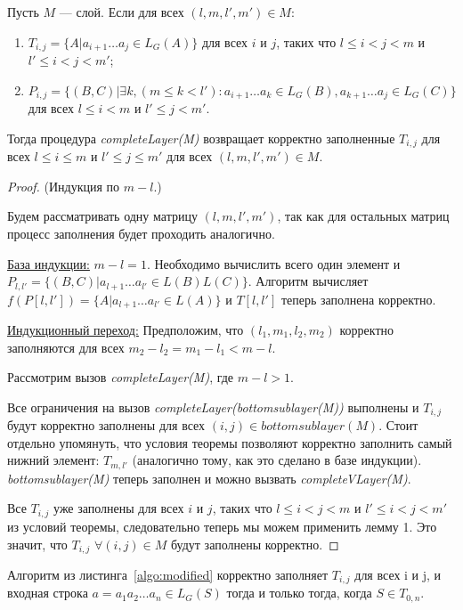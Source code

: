 \documentclass[14pt]{matmex-diploma-custom}
\begin{document}
\begin{theorem}
Пусть $M$ --- слой. Если для всех $(l, m, l', m') \in M$:
\begin{enumerate}
  \item $T_{i, j} = \{ A |  a_{i + 1} \dots a_{j} \in L_G(A)\}$ для всех $i$ и $j$, таких что $l \leq i < j < m$ и $l' \leq i < j < m'$;
  \item $P_{i, j} =  \{ (B, C) |\exists k, (m \le k < l'): a_{i + 1} \dots a_{k} \in L_G(B), a_{k + 1} \dots a_{j} \in L_G(C)\}$ для всех $l \leq i < m$ и $l' \leq j < m'$.
\end{enumerate}

Тогда процедура \textit{completeLayer(M)} возвращает корректно заполненные $T_{i, j}$ для всех $l \leq i \le m$ и $l' \leq j \le m'$ для всех $(l, m, l', m') \in M$.
\end{theorem}


\begin{proof}(Индукция по $m - l$.)

Будем рассматривать одну матрицу $(l, m, l', m')$, так как для остальных матриц процесс заполнения будет проходить аналогично.

\underline{База индукции:} $m - l = 1$. Необходимо вычислить всего один элемент и $P_{l, l'} =  \{ (B, C) |  a_{l + 1} \dots a_{l'} \in L(B)L(C)\}$. Алгоритм вычисляет $f(P[l, l']) = \{ A |  a_{l + 1} \dots a_{l'} \in L(A)\}$ и $T[l, l']$ теперь заполнена корректно.

\underline{Индукционный переход:} Предположим, что $(l_1, m_1, l_2, m_2)$ корректно заполняются для всех $m_2 - l_2 = m_1 - l_1 < m - l$.

Рассмотрим вызов \textit{completeLayer(M)}, где $m - l > 1$.

Все ограничения на вызов \textit{completeLayer(bottomsublayer(M))} выполнены и $T_{i, j}$ будут корректно заполнены для всех $(i, j) \in bottomsublayer(M)$. Стоит отдельно упомянуть, что условия теоремы позволяют корректно заполнить самый нижний элемент: $T_{m, l'}$ (аналогично тому, как это сделано в базе индукции).
\textit{bottomsublayer(M)} теперь заполнен и можно вызвать \textit{completeVLayer(M)}.

Все $T_{i,j}$ уже заполнены для всех $i$ и $j$, таких что $l \leq i < j < m$ и $l' \leq i < j < m'$ из условий теоремы, следовательно теперь мы можем применить лемму 1. Это значит, что $T_{i, j}$ $\forall (i, j) \in M$ будут заполнены корректно.
\end{proof}

\begin{theorem}
Алгоритм из листинга~\ref{algo:modified} корректно заполняет $T_{i, j}$ для всех i и j, и входная строка $a = a_{1}a_{2} \dots a_{n} \in L_{G}(S)$ тогда и только тогда, когда $S \in T_{0, n}$.
\end{theorem}
\end{document}
